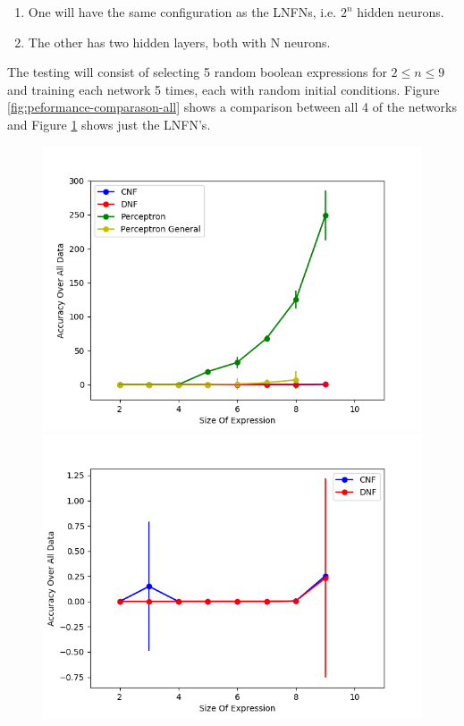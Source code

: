 \begin{enumerate}
	\item One will have the same configuration as the LNFNs, i.e. $2^n$ hidden neurons. \label{lnfn-peformance:mlpn-arch-1}
	\item The other has two hidden layers, both with N neurons.
\end{enumerate}

The testing will consist of selecting 5 random boolean expressions for $2 \leq n \leq 9$ and training each network 5 times, each with random initial conditions. Figure \ref{fig:peformance-comparason-all} shows a comparison between all 4 of the networks and Figure \ref{fig:peformance-comparason-cnfdnf} shows just the LNFN's.

\begin{figure}[H]
  \centering
  \begin{minipage}[b]{0.45\textwidth}
    \includegraphics[width=\textwidth]{All-Peformance-Comparason.png}
    \caption{}
    \label{fig:peformance-comparason-all}
  \end{minipage}
  \begin{minipage}[b]{0.45\textwidth}
    \includegraphics[width=\textwidth]{CNFvsDNF.png}
    \caption{}
    \label{fig:peformance-comparason-cnfdnf}
  \end{minipage}
  \hfill
\end{figure}

